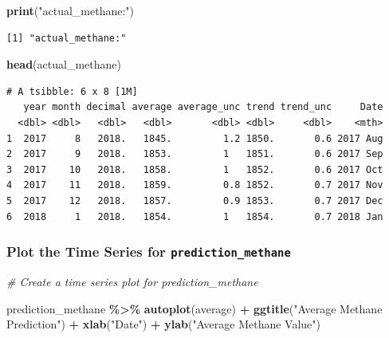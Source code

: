 \documentclass[
]{article}
\newenvironment{Shaded}{\begin{snugshade}}{\end{snugshade}}
\newcommand{\CommentTok}[1]{\textcolor[rgb]{0.56,0.35,0.01}{\textit{#1}}}
\newcommand{\FunctionTok}[1]{\textcolor[rgb]{0.13,0.29,0.53}{\textbf{#1}}}
\newcommand{\NormalTok}[1]{#1}
\newcommand{\SpecialCharTok}[1]{\textcolor[rgb]{0.81,0.36,0.00}{\textbf{#1}}}
\newcommand{\StringTok}[1]{\textcolor[rgb]{0.31,0.60,0.02}{#1}}
\begin{document}
\begin{Shaded}
\begin{Highlighting}[]
\FunctionTok{print}\NormalTok{(}\StringTok{"actual\_methane:"}\NormalTok{)}
\end{Highlighting}
\end{Shaded}

\begin{verbatim}
[1] "actual_methane:"
\end{verbatim}

\begin{Shaded}
\begin{Highlighting}[]
\FunctionTok{head}\NormalTok{(actual\_methane)}
\end{Highlighting}
\end{Shaded}

\begin{verbatim}
# A tsibble: 6 x 8 [1M]
   year month decimal average average_unc trend trend_unc     Date
  <dbl> <dbl>   <dbl>   <dbl>       <dbl> <dbl>     <dbl>    <mth>
1  2017     8   2018.   1845.         1.2 1850.       0.6 2017 Aug
2  2017     9   2018.   1853.         1   1851.       0.6 2017 Sep
3  2017    10   2018.   1858.         1   1852.       0.6 2017 Oct
4  2017    11   2018.   1859.         0.8 1852.       0.7 2017 Nov
5  2017    12   2018.   1857.         0.9 1853.       0.7 2017 Dec
6  2018     1   2018.   1854.         1   1854.       0.7 2018 Jan
\end{verbatim}

\hypertarget{plot-the-time-series-for-prediction_methane}{%
\subsubsection{\texorpdfstring{Plot the Time Series for
\texttt{prediction\_methane}}{Plot the Time Series for prediction\_methane}}\label{plot-the-time-series-for-prediction_methane}}

\begin{Shaded}
\begin{Highlighting}[]
\CommentTok{\# Create a time series plot for prediction\_methane}

\NormalTok{prediction\_methane }\SpecialCharTok{\%\textgreater{}\%}
  \FunctionTok{autoplot}\NormalTok{(average) }\SpecialCharTok{+}
  \FunctionTok{ggtitle}\NormalTok{(}\StringTok{"Average Methane Prediction"}\NormalTok{) }\SpecialCharTok{+}
  \FunctionTok{xlab}\NormalTok{(}\StringTok{"Date"}\NormalTok{) }\SpecialCharTok{+}
  \FunctionTok{ylab}\NormalTok{(}\StringTok{"Average Methane Value"}\NormalTok{)}
\end{Highlighting}
\end{Shaded}
\end{document}
